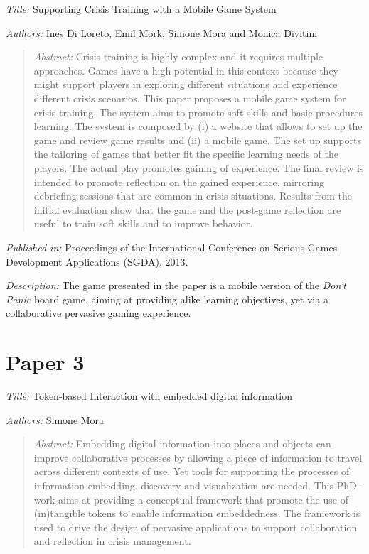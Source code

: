 \emph{Title: }Supporting Crisis Training with a Mobile Game System

\emph{Authors: }Ines Di Loreto, Emil Mork, Simone Mora and Monica Divitini

\begin{quote}
	\emph{Abstract: } Crisis training is highly complex and it requires multiple approaches. Games have a high potential in this context because they might support players in exploring different situations and experience different crisis scenarios. This paper proposes a mobile game system for crisis training. The system aims to promote soft skills and basic procedures learning. The system is composed by (i) a website that allows to set up the game and review game results and (ii) a mobile game. The set up supports the tailoring of games that better fit the specific learning needs of the players. The actual play promotes gaining of experience. The final review is intended to promote reflection on the gained experience, mirroring debriefing sessions that are common in crisis situations. Results from the initial evaluation show that the game and the post-game reflection are useful to train soft skills and to improve behavior.	
\end{quote}

\emph{Published in: }Proceedings of the International Conference on Serious Games Development Applications (SGDA), 2013.

\emph{Description: }The game presented in the paper is a mobile version of the \emph{Don't Panic} board game, aiming at providing alike learning objectives, yet via a collaborative pervasive gaming experience.

\section*{Paper 3}

\emph{Title: }Token-based Interaction with embedded digital information

\emph{Authors: }Simone Mora

\begin{quote}
	\emph{Abstract: }Embedding digital information into places and objects can improve collaborative processes by allowing a piece of information to travel across different contexts of use. Yet tools for supporting the processes of information embedding, discovery and visualization are needed. This PhD-work aims at providing a conceptual framework that promote the use of (in)tangible tokens to enable information embeddedness. The framework is used to drive the design of pervasive applications to support collaboration and reflection in crisis management.
\end{quote}

